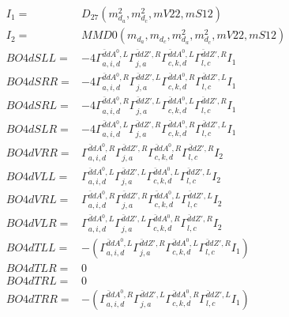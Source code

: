 \documentclass[A4,landscape]{article}
\begin{document}
\begin{align} 
I_1 = & D_{27}(m^2_{d_{{a}}}, m^2_{d_{{c}}}, mV22, mS12) \\ 
I_2 = & MMD0(m_{d_{{a}}}, m_{d_{{c}}}, m^2_{d_{{a}}}, m^2_{d_{{c}}}, mV22, mS12) \\ 
  BO4dSLL= & -4  \Gamma^{\bar{d}d A^0 ,L}_{a, i, d} \Gamma^{\bar{d}d {Z'} ,R}_{j, a} \Gamma^{\bar{d}d A^0 ,L}_{c, k, d} \Gamma^{\bar{d}d {Z'} ,R}_{l, c} I_1 \\ 
  BO4dSRR= & -4  \Gamma^{\bar{d}d A^0 ,R}_{a, i, d} \Gamma^{\bar{d}d {Z'} ,L}_{j, a} \Gamma^{\bar{d}d A^0 ,R}_{c, k, d} \Gamma^{\bar{d}d {Z'} ,L}_{l, c} I_1 \\ 
  BO4dSRL= & -4  \Gamma^{\bar{d}d A^0 ,R}_{a, i, d} \Gamma^{\bar{d}d {Z'} ,L}_{j, a} \Gamma^{\bar{d}d A^0 ,L}_{c, k, d} \Gamma^{\bar{d}d {Z'} ,R}_{l, c} I_1 \\ 
  BO4dSLR= & -4  \Gamma^{\bar{d}d A^0 ,L}_{a, i, d} \Gamma^{\bar{d}d {Z'} ,R}_{j, a} \Gamma^{\bar{d}d A^0 ,R}_{c, k, d} \Gamma^{\bar{d}d {Z'} ,L}_{l, c} I_1 \\ 
  BO4dVRR= &  \Gamma^{\bar{d}d A^0 ,R}_{a, i, d} \Gamma^{\bar{d}d {Z'} ,R}_{j, a} \Gamma^{\bar{d}d A^0 ,R}_{c, k, d} \Gamma^{\bar{d}d {Z'} ,R}_{l, c} I_2 \\ 
  BO4dVLL= &  \Gamma^{\bar{d}d A^0 ,L}_{a, i, d} \Gamma^{\bar{d}d {Z'} ,L}_{j, a} \Gamma^{\bar{d}d A^0 ,L}_{c, k, d} \Gamma^{\bar{d}d {Z'} ,L}_{l, c} I_2 \\ 
  BO4dVRL= &  \Gamma^{\bar{d}d A^0 ,R}_{a, i, d} \Gamma^{\bar{d}d {Z'} ,R}_{j, a} \Gamma^{\bar{d}d A^0 ,L}_{c, k, d} \Gamma^{\bar{d}d {Z'} ,L}_{l, c} I_2 \\ 
  BO4dVLR= &  \Gamma^{\bar{d}d A^0 ,L}_{a, i, d} \Gamma^{\bar{d}d {Z'} ,L}_{j, a} \Gamma^{\bar{d}d A^0 ,R}_{c, k, d} \Gamma^{\bar{d}d {Z'} ,R}_{l, c} I_2 \\ 
  BO4dTLL= & -( \Gamma^{\bar{d}d A^0 ,L}_{a, i, d} \Gamma^{\bar{d}d {Z'} ,R}_{j, a} \Gamma^{\bar{d}d A^0 ,L}_{c, k, d} \Gamma^{\bar{d}d {Z'} ,R}_{l, c} I_1) \\ 
  BO4dTLR= & 0 \\ 
  BO4dTRL= & 0 \\ 
  BO4dTRR= & -( \Gamma^{\bar{d}d A^0 ,R}_{a, i, d} \Gamma^{\bar{d}d {Z'} ,L}_{j, a} \Gamma^{\bar{d}d A^0 ,R}_{c, k, d} \Gamma^{\bar{d}d {Z'} ,L}_{l, c} I_1) \\ 
\end{align} 
\end{document}
